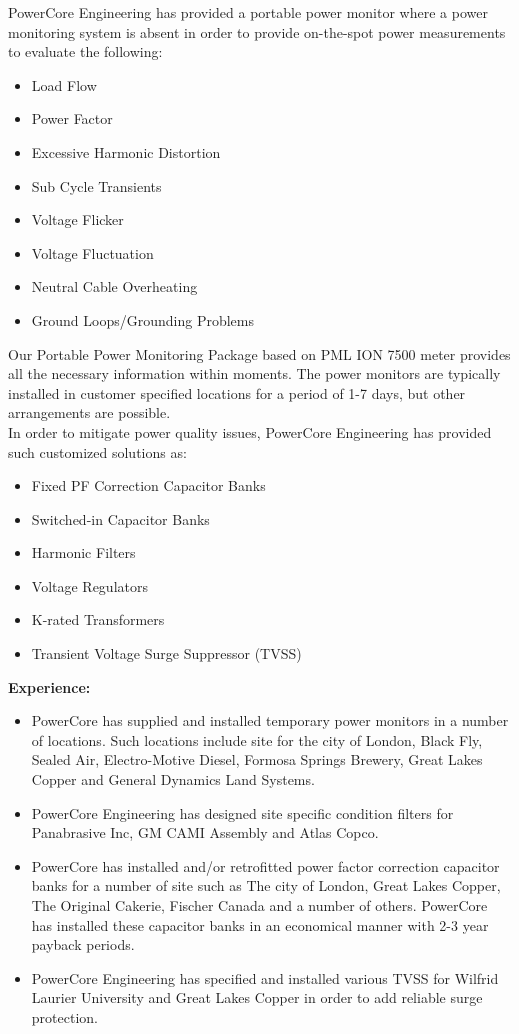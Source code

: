 PowerCore Engineering has provided a portable power monitor where a power monitoring system is absent in order to provide on-the-spot power measurements to evaluate the following:
\begin{itemize}
	\item Load Flow
	\item Power Factor
	\item Excessive Harmonic Distortion
	\item Sub Cycle Transients
	\item Voltage Flicker
	\item Voltage Fluctuation
	\item Neutral Cable Overheating
	\item Ground Loops/Grounding Problems
\end{itemize}

Our Portable Power Monitoring Package based on PML ION 7500 meter provides all the necessary information within moments. The power monitors are typically installed in customer specified locations for a period of 1-7 days, but other arrangements are possible. \\

In order to mitigate power quality issues, PowerCore Engineering has provided such customized solutions as:
\begin{itemize}
	\item Fixed PF Correction Capacitor Banks
	\item Switched-in Capacitor Banks
	\item Harmonic Filters
	\item Voltage Regulators
	\item K-rated Transformers
	\item Transient Voltage Surge Suppressor (TVSS)
\end{itemize}


\vspace{10 mm}
\noindent \textbf{Experience:}

\begin{itemize}
	\item PowerCore has supplied and installed temporary power monitors in a number of locations.  Such locations include site for the city of London, Black Fly, Sealed Air, Electro-Motive Diesel, Formosa Springs Brewery, Great Lakes Copper and General Dynamics Land Systems.
	\item PowerCore Engineering has designed site specific condition filters for Panabrasive Inc, GM CAMI Assembly and Atlas Copco.
	\item PowerCore has installed and/or retrofitted power factor correction capacitor banks for a number of site such as The city of London, Great Lakes Copper, The Original Cakerie, Fischer Canada and a number of others. PowerCore has installed these capacitor banks in an economical manner with 2-3 year payback periods.
	\item PowerCore Engineering has specified and installed various TVSS for Wilfrid Laurier University and Great Lakes Copper in order to add reliable surge protection.
\end{itemize}

